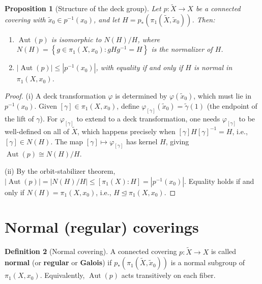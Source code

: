 \documentclass[12pt,a4paper,openany]{book}
\theoremstyle{definition}
\newtheorem{definition}{Definition}[chapter]
\theoremstyle{plain}
\newtheorem{proposition}[definition]{Proposition}
\theoremstyle{remark}
\DeclareMathOperator{\Aut}{Aut}
\newcommand{\abs}[1]{\left|#1\right|}
\newcommand{\set}[1]{\left\{#1\right\}}
\begin{document}
\begin{proposition}[Structure of the deck group]\label{prop:deck-structure}
  Let $p\colon \widetilde{X} \to X$ be a connected covering with
  $\tilde{x}_0 \in p^{-1}(x_0)$, and let $H = p_*(\pi_1(\widetilde{X},
  \tilde{x}_0))$.  Then:
  \begin{enumerate}[label=(\roman*)]
    \item $\Aut(p)$ is isomorphic to $N(H)/H$, where
      $N(H) = \set{g \in \pi_1(X, x_0) : gHg^{-1} = H}$ is the normalizer
      of $H$.
    \item $\abs{\Aut(p)} \leq \abs{p^{-1}(x_0)}$, with equality if and only if
      $H$ is normal in $\pi_1(X, x_0)$.
  \end{enumerate}
\end{proposition}

\begin{proof}
  (i) A deck transformation $\varphi$ is determined by $\varphi(\tilde{x}_0)$,
  which must lie in $p^{-1}(x_0)$.  Given $[\gamma] \in \pi_1(X, x_0)$,
  define $\varphi_{[\gamma]}(\tilde{x}_0) = \tilde{\gamma}(1)$ (the endpoint
  of the lift of $\gamma$).  For $\varphi_{[\gamma]}$ to extend to a deck
  transformation, one needs $\varphi_{[\gamma]}$ to be well-defined on all of
  $\widetilde{X}$, which happens precisely when
  $[\gamma] H [\gamma]^{-1} = H$, i.e., $[\gamma] \in N(H)$.  The map
  $[\gamma] \mapsto \varphi_{[\gamma]}$ has kernel $H$, giving
  $\Aut(p) \cong N(H)/H$.

  (ii) By the orbit-stabilizer theorem, $\abs{\Aut(p)} =
  \abs{N(H)/H} \leq [\pi_1(X) : H] = \abs{p^{-1}(x_0)}$.  Equality holds
  if and only if $N(H) = \pi_1(X, x_0)$, i.e., $H \trianglelefteq
  \pi_1(X, x_0)$.
\end{proof}

\section{Normal (regular) coverings}\label{sec:normal-coverings}

\begin{definition}[Normal covering]\label{def:normal-covering}
  A connected covering $p\colon \widetilde{X} \to X$ is called
  \textbf{normal} (or \textbf{regular} or \textbf{Galois}) if
  $p_*(\pi_1(\widetilde{X}, \tilde{x}_0))$ is a normal subgroup of
  $\pi_1(X, x_0)$.  Equivalently, $\Aut(p)$ acts transitively on each fiber.
\end{definition}
\end{document}
